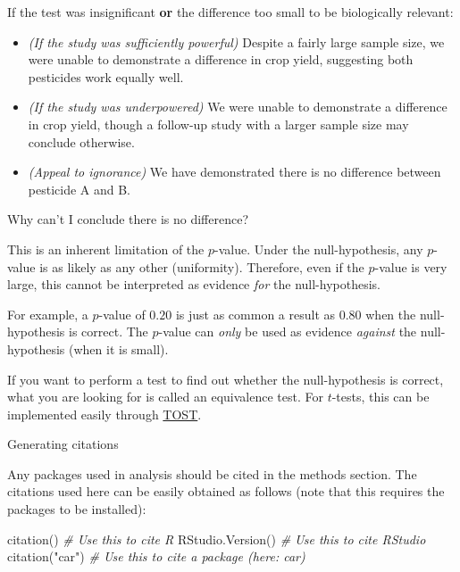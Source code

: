 \documentclass[
]{book}
\newenvironment{Shaded}{\begin{snugshade}}{\end{snugshade}}
\newcommand{\CommentTok}[1]{\textcolor[rgb]{0.56,0.35,0.01}{\textit{#1}}}
\newcommand{\FunctionTok}[1]{\textcolor[rgb]{0.00,0.00,0.00}{#1}}
\newcommand{\NormalTok}[1]{#1}
\newcommand{\StringTok}[1]{\textcolor[rgb]{0.31,0.60,0.02}{#1}}
\providecommand{\tightlist}{%
  \setlength{\itemsep}{0pt}\setlength{\parskip}{0pt}}
\begin{document}
If the test was insignificant \textbf{or} the difference too small to be biologically relevant:

\begin{itemize}
\tightlist
\item
  \emph{(If the study was sufficiently powerful)} Despite a fairly large sample size, we were unable to demonstrate a difference in crop yield, suggesting both pesticides work equally well.
\item
  \emph{(If the study was underpowered)} We were unable to demonstrate a difference in crop yield, though a follow-up study with a larger sample size may conclude otherwise.
\item
  \emph{(Appeal to ignorance)} We have demonstrated there is no difference between pesticide A and B.
\end{itemize}

Why can't I conclude there is no difference?

This is an inherent limitation of the \(p\)-value. Under the null-hypothesis, any \(p\)-value is as likely as any other (uniformity). Therefore, even if the \(p\)-value is very large, this cannot be interpreted as evidence \emph{for} the null-hypothesis.

For example, a \(p\)-value of \(0.20\) is just as common a result as \(0.80\) when the null-hypothesis is correct. The \(p\)-value can \emph{only} be used as evidence \emph{against} the null-hypothesis (when it is small).

If you want to perform a test to find out whether the null-hypothesis is correct, what you are looking for is called an equivalence test. For \(t\)-tests, this can be implemented easily through \href{https://en.wikipedia.org/wiki/Equivalence_test\#TOST_procedure}{TOST}.

Generating citations

Any packages used in analysis should be cited in the methods section. The citations used here can be easily obtained as follows (note that this requires the packages to be installed):

\begin{Shaded}
\begin{Highlighting}[]
\FunctionTok{citation}\NormalTok{()        }\CommentTok{\# Use this to cite R}
\FunctionTok{RStudio.Version}\NormalTok{() }\CommentTok{\# Use this to cite RStudio}
\FunctionTok{citation}\NormalTok{(}\StringTok{"car"}\NormalTok{)   }\CommentTok{\# Use this to cite a package (here: car)}
\end{Highlighting}
\end{Shaded}
\end{document}
